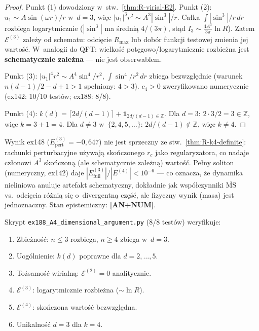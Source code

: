 \begin{proof}
Punkt (1) dowodziony w~stw.~\ref{thm:R-virial-E2}.
Punkt (2): $u_1 \sim A\sin(\omega r)/r$ w~$d=3$, wi\k{e}c
$|u_1|^3 r^2 \sim A^3|\sin^3|/r$.
Ca\l{}ka $\int |\sin^3|/r\,dr$ rozbiega logarytmicznie
($|\sin^3|$ ma \'sredni\k{a} $4/(3\pi)$, st\k{a}d
$I_3 \sim \frac{4A^3}{3\pi}\ln R$).
Zatem $\mathcal{E}^{(3)}$ zale\.zy od schematu:
odci\k{e}cie $R_{\max}$ lub dob\'or funkcji testowej
zmienia jej warto\'s\'c. W~analogii do QFT:
wielko\'s\'c pot\k{e}gowo/logarytmicznie rozbie\.zna
jest \textbf{schematycznie zale\.zna}
--- nie jest obserwablem.

Punkt (3): $|u_1|^4 r^2 \sim A^4 \sin^4/r^2$,
$\int \sin^4/r^2\,dr$ zbiega bezwzgl\k{e}dnie
(warunek $n(d-1)/2 - d + 1 > 1$ spe\l{}niony: $4 > 3$).
$c_4 > 0$ zweryfikowano numerycznie
(ex142: 10/10 test\'ow; ex188: 8/8).

Punkt (4): $k(d) = \lceil 2d/(d-1) \rceil + \mathbf{1}_{2d/(d-1)\in\mathbb{Z}}$.
Dla $d = 3$: $2\cdot3/2 = 3 \in \mathbb{Z}$, wi\k{e}c $k = 3 + 1 = 4$.
Dla $d \neq 3$ w~$\{2,4,5,\ldots\}$: $2d/(d-1) \notin \mathbb{Z}$,
wi\k{e}c $k \neq 4$.
\end{proof}

\begin{remark}%
\label{rem:R-E3-reconciliation}
Wynik ex148 ($E^{(3)}_{\mathrm{pert}} = -0{,}647$) nie jest sprzeczny
ze stw.~\ref{thm:R-k4-definite}: rachunki perturbacyjne u\.zywaj\k{a}
sko\'nczonego $r_c$ jako regularyzatora, co nadaje cz\l{}onowi $A^3$
sko\'nczon\k{a} (ale schematycznie zale\.zn\k{a}) warto\'s\'c.
Pe\l{}ny soliton (numeryczny, ex142) daje
$|E^{(3)}_{\mathrm{full}}|/|E^{(4)}| < 10^{-6}$ ---
co oznacza, \.ze dynamika nieliniowa anuluje artefakt schematyczny,
dok\l{}adnie jak wsp\'o\l{}czynniki $\overline{\mathrm{MS}}$
vs.\ odci\k{e}cia r\'o\.zni\k{a} si\k{e} o~divergentn\k{a} cz\k{e}\'s\'c,
ale fizyczny wynik (masa) jest jednoznaczny.
Stan epistemiczny: \textbf{[AN+NUM]}.
\end{remark}

\begin{remark}%
\label{rem:R-ex188}
Skrypt \texttt{ex188\_A4\_dimensional\_argument.py} (8/8 test\'ow)
weryfikuje:
\begin{enumerate}[nosep]
  \item Zbie\.zno\'s\'c: $n \leq 3$ rozbiega, $n \geq 4$ zbiega w~$d = 3$.
  \item Uog\'olnienie: $k(d)$ poprawne dla $d = 2, \ldots, 5$.
  \item To\.zsamo\'s\'c wirialn\k{a}: $\mathcal{E}^{(2)} = 0$ analitycznie.
  \item $\mathcal{E}^{(3)}$: logarytmicznie rozbie\.zna
    ($\sim \ln R$).
  \item $\mathcal{E}^{(4)}$: sko\'nczona warto\'s\'c bezwzgl\k{e}dna.
  \item Unikalno\'s\'c $d = 3$ dla $k = 4$.
\end{enumerate}
\end{remark}
